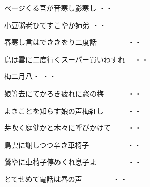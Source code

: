 \vspace{0.6cm}
\begin{shiika}ページくる吾が音寒し影寒し
\hfill{・・}\end{shiika}
\vspace{0.6cm}
\begin{shiika}小豆粥老ひてすこやか姉弟
\hfill{・・}\end{shiika}
\vspace{0.6cm}
\begin{shiika}春寒し言はでききをり二度話　　　　
\hfill{・・}\end{shiika}
\vspace{0.6cm}
\begin{shiika}鳥は雲に二度行くスーパー買いわすれ　
\hfill{・・}\end{shiika}
\vspace{0.6cm}
\begin{shiika}梅二月八・
\hfill{・・}\end{shiika}
\vspace{0.6cm}
\begin{shiika}娘等去にてかろき疲れに窓の梅　　　
\hfill{・・}\end{shiika}
\vspace{0.6cm}
\begin{shiika}よきことを知らす娘の声梅紅し　　　
\hfill{・・}\end{shiika}
\vspace{0.6cm}
\begin{shiika}芽吹く庭健かと木々に呼びかけて　　
\hfill{・・}\end{shiika}
\vspace{0.6cm}
\begin{shiika}鳥雲に謝しつつ辛き車椅子　　　　　
\hfill{・・}\end{shiika}
\vspace{0.6cm}
\begin{shiika}鶯やに車椅子停めくれ息子よ　　　　
\hfill{・・}\end{shiika}
\vspace{0.6cm}
\begin{shiika}とてせめて電話は春の声　　　　
\hfill{・・}\end{shiika}
